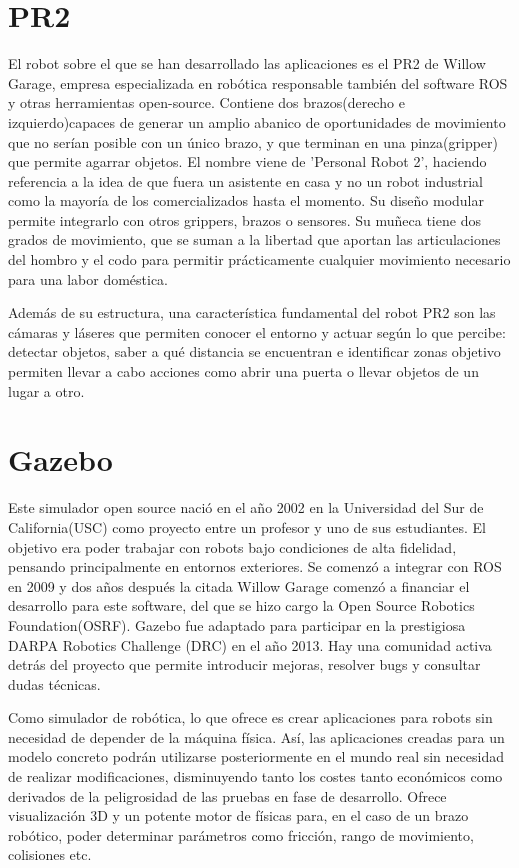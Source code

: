 \documentclass[12pt,spanish,chapterprefix, numbers=noenddot]{book}
\numberwithin{equation}{section}
\numberwithin{figure}{section}
\begin{document}
\section{PR2}
El robot sobre el que se han desarrollado las aplicaciones es el PR2 de Willow Garage, empresa especializada en robótica responsable también del software ROS y otras herramientas open-source. Contiene dos brazos(derecho e izquierdo)capaces de generar un amplio abanico de oportunidades de movimiento que no serían posible con un único brazo, y que terminan en una pinza(gripper) que permite agarrar objetos. El nombre viene de 'Personal Robot 2', haciendo referencia a la idea de que fuera un asistente en casa y no un robot industrial como la mayoría de los comercializados hasta el momento.
Su diseño modular permite integrarlo con otros grippers, brazos o sensores.
Su muñeca tiene dos grados de movimiento, que se suman a la libertad que aportan las articulaciones del hombro y el codo para permitir prácticamente cualquier movimiento necesario para una labor doméstica.

Además de su estructura, una característica fundamental del robot PR2 son las cámaras y láseres que permiten conocer el entorno y actuar según lo que percibe: detectar objetos, saber a qué distancia se encuentran e identificar zonas objetivo permiten llevar a cabo acciones como abrir una puerta o llevar objetos de un lugar a otro.

\section{Gazebo}
Este simulador open source nació en el año 2002 en la Universidad del Sur de California(USC) como proyecto entre un profesor y uno de sus estudiantes. El objetivo era poder trabajar con robots bajo condiciones de alta fidelidad, pensando principalmente en entornos exteriores. Se comenzó a integrar con ROS en 2009 y dos años después la citada Willow Garage comenzó a financiar el desarrollo para este software, del que se hizo cargo la Open Source Robotics Foundation(OSRF).
Gazebo fue adaptado para participar en la prestigiosa DARPA Robotics Challenge (DRC) en el año 2013. Hay una comunidad activa detrás del proyecto que permite introducir mejoras, resolver bugs y consultar dudas técnicas.

Como simulador de robótica, lo que ofrece es crear aplicaciones para robots sin necesidad de depender de la máquina física. Así, las aplicaciones creadas para un modelo concreto podrán utilizarse posteriormente en el mundo real sin necesidad de realizar modificaciones, disminuyendo tanto los costes tanto económicos como derivados de la peligrosidad de las pruebas en fase de desarrollo.
Ofrece visualización 3D y un potente motor de físicas para, en el caso de un brazo robótico, poder determinar parámetros como fricción, rango de movimiento, colisiones etc.
\end{document}
